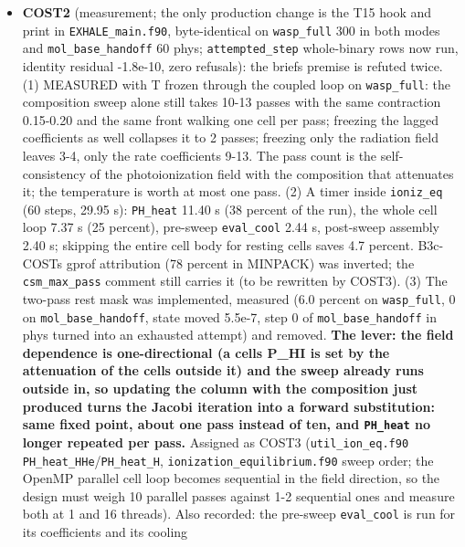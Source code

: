 \documentclass[english,a4paper]{my_memo}
\begin{document}
\begin{itemize}
  by the certification (HYG-PROJ, spans \texttt{global\_parameters},
  \texttt{certification.f90}, main); design section 9 decision 8 still names the
  projection as a live correction (dated record).
\item
  \textbf{COST2} (measurement; the only production change is the T15 hook and
  print in \texttt{EXHALE\_main.f90}, byte-identical on \texttt{wasp\_full} 300 in both
  modes and \texttt{mol\_base\_handoff} 60 phys; \texttt{attempted\_step} whole-binary rows
  now run, identity residual -1.8e-10, zero refusals): the brief\textquotesingle s premise
  is refuted twice. (1) MEASURED with T frozen through the coupled loop on
  \texttt{wasp\_full}: the composition sweep alone still takes 10-13 passes with the
  same contraction 0.15-0.20 and the same front walking one cell per pass;
  freezing the lagged coefficients as well collapses it to 2 passes;
  freezing only the radiation field leaves 3-4, only the rate coefficients
  9-13. The pass count is the self-consistency of the photoionization field
  with the composition that attenuates it; the temperature is worth at most
  one pass. (2) A timer inside \texttt{ioniz\_eq} (60 steps, 29.95 s): \texttt{PH\_heat}
  11.40 s (38 percent of the run), the whole cell loop 7.37 s (25 percent),
  pre-sweep \texttt{eval\_cool} 2.44 s, post-sweep assembly 2.40 s; skipping the
  entire cell body for resting cells saves 4.7 percent. B3c-COST\textquotesingle s gprof
  attribution (78 percent in MINPACK) was inverted; the \texttt{csm\_max\_pass}
  comment still carries it (to be rewritten by COST3). (3) The two-pass rest
  mask was implemented, measured (6.0 percent on \texttt{wasp\_full}, 0 on
  \texttt{mol\_base\_handoff}, state moved 5.5e-7, step 0 of \texttt{mol\_base\_handoff} in
  phys turned into an exhausted attempt) and removed. \textbf{The lever: the field
  dependence is one-directional (a cell\textquotesingle s P\_HI is set by the attenuation of
  the cells outside it) and the sweep already runs outside in, so updating
  the column with the composition just produced turns the Jacobi iteration
  into a forward substitution: same fixed point, about one pass instead of
  ten, and \texttt{PH\_heat} no longer repeated per pass.} Assigned as COST3
  (\texttt{util\_ion\_eq.f90} \texttt{PH\_heat\_HHe}/\texttt{PH\_heat\_H}, \texttt{ionization\_equilibrium.f90}
  sweep order; the OpenMP parallel cell loop becomes sequential in the field
  direction, so the design must weigh 10 parallel passes against 1-2
  sequential ones and measure both at 1 and 16 threads). Also recorded: the
  pre-sweep \texttt{eval\_cool} is run for its coefficients and its cooling

\end{itemize}
\end{document}
